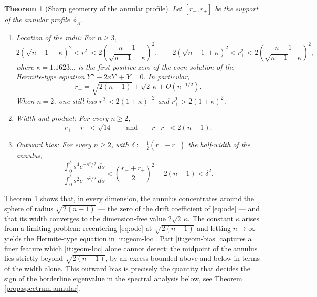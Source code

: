 \documentclass[11pt]{article}
\numberwithin{equation}{section}
\newtheorem{theorem}{Theorem}[section]
\theoremstyle{definition}
\begin{document}
\begin{theorem}[Sharp geometry of the annular profile]\label{thm:annulus-geometry}
    Let $[r_-,r_+]$ be the support of the annular profile $\phi_A$.
    \begin{enumerate}[label=(\roman*), topsep=0pt]
        \item\label{it:geom-loc} \emph{Location of the radii:} For $n\geq3$,
        \[
            2\left(\sqrt{n-1}-\kappa\right)^2<r_-^2<2\left(\frac{n-1}{\sqrt{n-1}+\kappa}\right)^2,
            \qquad
            2\left(\sqrt{n-1}+\kappa\right)^2<r_+^2<2\left(\frac{n-1}{\sqrt{n-1}-\kappa}\right)^2,
        \]
        where $\kappa=1.1623\ldots$ is the first positive zero of the even solution of the Hermite-type equation $Y''-2xY'+Y=0$. In particular,
        \begin{equation}\label{eq:fine-radius-estimate}
            r_\pm=\sqrt{2(n-1)}\pm\sqrt2\,\kappa+O(n^{-1/2}).
        \end{equation}
        When $n=2$, one still has $r_-^2<2(1+\kappa)^{-2}$ and $r_+^2>2(1+\kappa)^2$.
        \item\label{it:geom-width} \emph{Width and product:} For every $n\geq2$,
        \[
            r_+-r_-<\sqrt{14} \qquad \text{and} \qquad r_-\,r_+<2(n-1).
        \]
        \item\label{it:geom-bias} \emph{Outward bias:} For every $n\geq2$, with $\delta:=\tfrac12(r_+-r_-)$ the half-width of the annulus,
        \[
            \frac{\int_0^{\delta}s^4e^{-s^2/2}\,ds}{\int_0^{\delta}s^2e^{-s^2/2}\,ds}
            <\left(\frac{r_-+r_+}{2}\right)^2-2(n-1)
            <\delta^2.
        \]
    \end{enumerate}
\end{theorem}

Theorem \ref{thm:annulus-geometry} shows that, in every dimension, the annulus concentrates around the sphere of radius $\sqrt{2(n-1)}$ --- the zero of the drift coefficient of \eqref{eq:ode} --- and that its width converges to the dimension-free value $2\sqrt{2}\,\kappa$. The constant $\kappa$ arises from a limiting problem: recentering \eqref{eq:ode} at $\sqrt{2(n-1)}$ and letting $n\to\infty$ yields the Hermite-type equation in \ref{it:geom-loc}. Part \ref{it:geom-bias} captures a finer feature which \ref{it:geom-loc} alone cannot detect: the midpoint of the annulus lies strictly beyond $\sqrt{2(n-1)}$, by an excess bounded above and below in terms of the width alone. This outward bias is precisely the quantity that decides the sign of the borderline eigenvalue in the spectral analysis below, see Theorem \ref{prop:spectrum-annular}.
\end{document}
